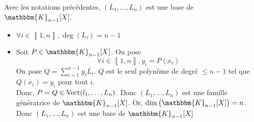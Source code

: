 \begin{prop}
	Avec les notations précédentes, $(L_1, \ldots, L_n)$ est une base de $\mathbbm{K}_{n-1}[X]$.
\end{prop}

\begin{prv}
	\begin{itemize}
		\item $\forall i \in \left\llbracket 1,n \right\rrbracket, \deg(L_i) = n - 1$
		\item Soit $P \in \mathbbm{K}_{n-1}[X]$. On pose \[
				\forall i \in \left\llbracket 1,n \right\rrbracket, y_i = P(x_i)
			\]
			On pose $Q = \sum_{i=1}^{n-1}y_i L_i$. $Q$ est le seul polynôme de degré $\le n-1$ tel que $Q(x_i) = y_i$ pour tout $i$.\\
			Donc, $P = Q \in \operatorname{Vect}(l_1, \ldots, L_n)$. Donc $(L_1, \ldots, L_n)$ est une famille génératrice de $\mathbbm{K}_{n-1}[X]$. Or, $\dim\big(\mathbbm{K}_{n-1}[X]\big) = n$. Donc $(L_1, \ldots, L_n)$ est une base de $\mathbbm{K}_{n-1}[X]$
	\end{itemize}
\end{prv}

